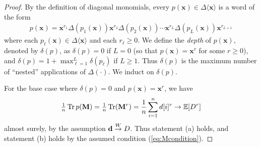 \documentclass[10pt,reqno]{amsart}
\def\x{\mathbf{x}}
\def\toW{\overset{W}{\to}}
\def\bx{\mathbf{x}}
\def\Tr{\operatorname{Tr}}
\begin{document}
\begin{proof}
By the definition of diagonal monomials, every $p(\bx)\in\Delta\langle\bx
\rangle$ is a word of the form
\begin{align}\label{eq:diag_monomial}
	p(\bx) = \bx^{r_1} \Delta(p_1(\bx)) \bx^{r_2} \Delta(p_2(\bx))
	\cdots \bx^{r_{L}} \Delta(p_{L}(\bx))\bx^{r_{L+1}}
\end{align}
where each $p_\ell(\x) \in \Delta \langle \bx \rangle$ and each $r_\ell \geq 0$.
We define the \emph{depth} of $p(\bx)$, denoted by $\delta(p)$, as
$\delta(p)=0$ if $L=0$ (so that $p(\bx)=\bx^r$ for some $r\geq 0$), and
$\delta(p)=1+\max_{\ell=1}^L \delta(p_\ell)$ if $L \geq 1$. Thus
$\delta(p)$ is the maximum number of ``nested'' applications of
$\Delta(\cdot)$. We induct on $\delta(p)$.

For the base case where $\delta(p)=0$ and $p(\bx)=\bx^r$, we have
\[\tfrac{1}{n} \Tr p(\bM)= \tfrac{1}{n} \Tr(\bM^r) 
= \frac{1}{n} \sum_{i=1}^n d[i]^r 
\to \EE[D^r]\]
almost surely,
by the assumption $\bd\toW D$. Thus statement (a) holds, and statement (b) holds
by the assumed condition (\ref{eq:Mcondition}).


\end{proof}
\end{document}
